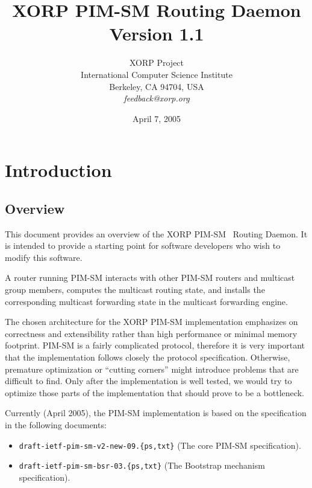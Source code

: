 \documentclass[11pt]{article}
\begin{document}
\title{XORP PIM-SM Routing Daemon \\
\vspace{1ex}
Version 1.1}
\author{ XORP Project					\\
	 International Computer Science Institute	\\
	 Berkeley, CA 94704, USA			\\
	 {\it feedback@xorp.org}
}
\date{April 7, 2005}

\maketitle

\thispagestyle{empty}


\section{Introduction}


\subsection{Overview}

This document provides an overview of the XORP PIM-SM~\cite{PIM-SM}
Routing Daemon. It is intended to provide a starting point for software
developers who wish to modify this software.

A router running PIM-SM interacts with other PIM-SM routers and
multicast group members, computes the multicast routing state, and installs
the corresponding multicast forwarding state in the multicast forwarding
engine.

The chosen architecture for the XORP PIM-SM implementation emphasizes on
correctness and extensibility rather than high performance or minimal
memory footprint. PIM-SM is a fairly complicated protocol, therefore it
is very important that the implementation follows closely the protocol
specification. Otherwise, premature optimization or ``cutting corners''
might introduce problems that are difficult to find. Only after the
implementation is well tested, we would
try to optimize those parts of the implementation that should prove
to be a bottleneck.

Currently (April 2005), the PIM-SM implementation is based
on the specification in the following documents:

\begin{itemize}
  \item \verb=draft-ietf-pim-sm-v2-new-09.{ps,txt}= (The core PIM-SM
  specification).
  \item \verb=draft-ietf-pim-sm-bsr-03.{ps,txt}= (The Bootstrap mechanism
  specification).
\end{itemize}
\end{document}
